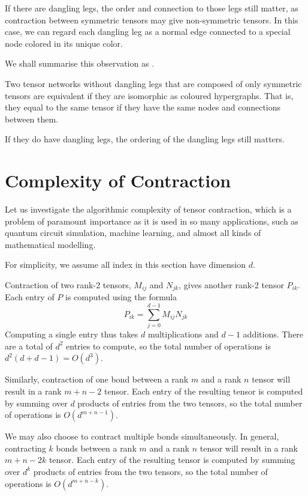 If there are dangling legs, the order and connection to those legs still matter, as contraction between symmetric tensors may give non-symmetric tensors.
In this case, we can regard each dangling leg as a normal edge connected to a special node colored in its unique color.

We shall summarise this observation as .

\begin{lemma}
	Two tensor networks without dangling legs that are composed of only symmetric tensors are equivalent if they are isomorphic as coloured hypergraphs.
	That is, they equal to the same tensor if they have the same nodes and connections between them.

	If they do have dangling legs, the ordering of the dangling legs still matters. 
\end{lemma}\label{lem:only-connectivity-matters}

\section{Complexity of Contraction}

Let us investigate the algorithmic complexity of tensor contraction, which is a problem of paramount importance as it is used in so many applications, such as quantum circuit simulation, machine learning, and almost all kinds of mathematical modelling.

For simplicity, we assume all index in this section have dimension $d$.

Contraction of two rank-2 tensors, $M_{ij}$ and $N_{jk}$, gives another rank-2 tensor $P_{ik}$.
Each entry of $P$ is computed using the formula
$$
	P_{ik} = \sum_{j=0}^{d-1} M_{ij} N_{jk}	
$$
Computing a single entry thus takes $d$ multiplications and $d-1$ additions.
There are a total of $d^2$ entries to compute, so the total number of operations is $d^2(d + d - 1) = O(d^3)$.

Similarly, contraction of one bond between a rank $m$ and a rank $n$ tensor will result in a rank $m + n - 2$ tensor. 
Each entry of the resulting tensor is computed by summing over $d$ products of entries from the two tensors, so the total number of operations is $O(d^{m+n-1})$.

We may also choose to contract multiple bonds simultaneously. 
In general, contracting $k$ bonds between a rank $m$ and a rank $n$ tensor will result in a rank $m + n - 2k$ tensor.
Each entry of the resulting tensor is computed by summing over $d^k$ products of entries from the two tensors, so the total number of operations is $O(d^{m+n-k})$.

